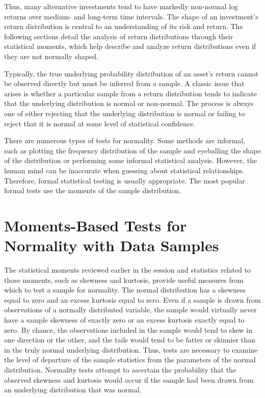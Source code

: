 \documentclass[11pt]{article}
\begin{document}
Thus, many alternative investments tend to have markedly non-normal log returns over medium- and long-term time intervals. The shape of an investment's return distribution is central to an understanding of its risk and return. The following sections detail the analysis of return distributions through their statistical moments, which help describe and analyze return distributions even if they are not normally shaped.

Typically, the true underlying probability distribution of an asset's return cannot be observed directly but must be inferred from a sample. A classic issue that arises is whether a particular sample from a return distribution tends to indicate that the underlying distribution is normal or non-normal. The process is always one of either rejecting that the underlying distribution is normal or failing to reject that it is normal at some level of statistical confidence.

There are numerous types of tests for normality. Some methods are informal, such as plotting the frequency distribution of the sample and eyeballing the shape of the distribution or performing some informal statistical analysis. However, the human mind can be inaccurate when guessing about statistical relationships. Therefore, formal statistical testing is usually appropriate. The most popular formal tests use the moments of the sample distribution.

\section*{Moments-Based Tests for Normality with Data Samples}
The statistical moments reviewed earlier in the session and statistics related to those moments, such as skewness and kurtosis, provide useful measures from which to test a sample for normality. The normal distribution has a skewness equal to zero and an excess kurtosis equal to zero. Even if a sample is drawn from observations of a normally distributed variable, the sample would virtually never have a sample skewness of exactly zero or an excess kurtosis exactly equal to zero. By chance, the observations included in the sample would tend to skew in one direction or the other, and the tails would tend to be fatter or skinnier than in the truly normal underlying distribution. Thus, tests are necessary to examine the level of departure of the sample statistics from the parameters of the normal distribution. Normality tests attempt to ascertain the probability that the observed skewness and kurtosis would occur if the sample had been drawn from an underlying distribution that was normal.
\end{document}
